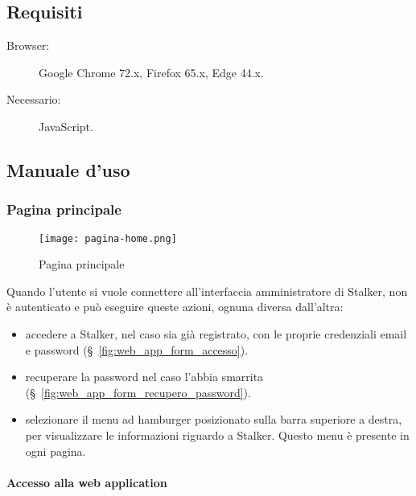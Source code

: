 \documentclass[../manuale-utente.tex]{subfiles}
\begin{document}
\subsection{Requisiti}%
\label{sub:web_app_requisiti}

\begin{description}
    \item[Browser:] Google Chrome 72.x, Firefox 65.x, Edge 44.x.
    \item[Necessario:] JavaScript.
\end{description}


\subsection{Manuale d'uso}%
\label{sub:manuale-uso-web}

\subsubsection{Pagina principale}%
\label{subs:pagina_principale}

\begin{figure}[H]
    \centering
    \texttt{[image: pagina-home.png]}
    \caption{Pagina principale}%
    \label{fig:web_app_pagina_principale}
\end{figure}
Quando l'utente si vuole connettere all'interfaccia amministratore di Stalker, non è autenticato e può eseguire queste azioni, ognuna diversa dall'altra:
\begin{itemize}
    \item accedere a Stalker, nel caso sia già registrato, con le proprie credenziali email e password (§~\ref{fig:web_app_form_accesso}).
    \item recuperare la password nel caso l'abbia smarrita (§~\ref{fig:web_app_form_recupero_password}).
    \item selezionare il menu ad hamburger posizionato sulla barra superiore a destra, per visualizzare le informazioni riguardo a Stalker. Questo menu è presente in ogni pagina.
\end{itemize}

\paragraph{Accesso alla web application}%
\label{par:accesso_alla_web_application}
\end{document}
